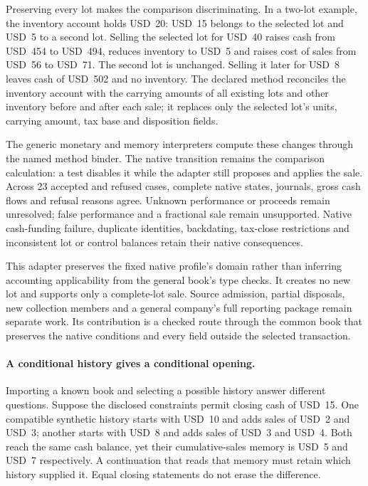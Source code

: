 Preserving every lot makes the comparison discriminating. In a two-lot example,
the inventory account holds USD~20: USD~15 belongs to the selected lot and USD~5
to a second lot. Selling the selected lot for USD~40 raises cash from USD~454
to USD~494, reduces inventory to USD~5 and raises cost of sales from USD~56 to
USD~71. The second lot is unchanged. Selling it later for USD~8 leaves cash of
USD~502 and no inventory. The declared method reconciles the inventory account
with the carrying amounts of all existing lots and other inventory before and
after each sale; it replaces only the selected lot's units, carrying amount,
tax base and disposition fields.

The generic monetary and memory interpreters compute these changes through the
named method binder. The native transition remains the comparison calculation:
a test disables it while the adapter still proposes and applies the sale. Across
23 accepted and refused cases, complete native states, journals, gross cash flows
and refusal reasons agree. Unknown performance or proceeds remain unresolved;
false performance and a fractional sale remain unsupported. Native cash-funding
failure, duplicate identities, backdating, tax-close restrictions and inconsistent
lot or control balances retain their native consequences.

This adapter preserves the fixed native profile's domain rather than inferring
accounting applicability from the general book's type checks. It creates no new
lot and supports only a complete-lot sale. Source admission, partial disposals,
new collection members and a general company's full reporting package remain
separate work. Its contribution is a checked route through the common book that
preserves the native conditions and every field outside the selected transaction.

\paragraph{A conditional history gives a conditional opening.}
Importing a known book and selecting a possible history answer different
questions. Suppose the disclosed constraints permit closing cash of USD~15.
One compatible synthetic history starts with USD~10 and adds sales of USD~2
and USD~3; another starts with USD~8 and adds sales of USD~3 and USD~4.
Both reach the same cash balance, yet their cumulative-sales memory is USD~5
and USD~7 respectively. A continuation that reads that memory must retain
which history supplied it. Equal closing statements do not erase the difference.

